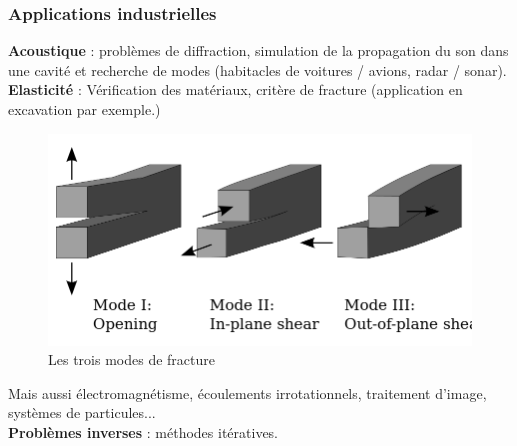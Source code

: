 \documentclass[11pt]{beamer}
\begin{document}
	\begin{frame}
		\frametitle{Applications industrielles}
		
		\textbf{Acoustique} : problèmes de diffraction, simulation de la propagation du son dans une cavité et recherche de modes (habitacles de voitures / avions, radar / sonar). \\
		\textbf{Elasticité} : Vérification des matériaux, critère de fracture (application en excavation par exemple.)
		\begin{figure}
			\centering
			\includegraphics[scale=0.12]{FractureModes}
			\caption{Les trois modes de fracture}
		\end{figure}
		Mais aussi électromagnétisme, écoulements irrotationnels, traitement d'image, systèmes de particules...\\
		\textbf{Problèmes inverses} : méthodes itératives. 		
	\end{frame}
	
\end{document}
